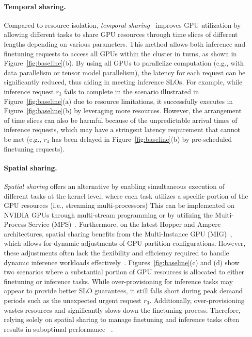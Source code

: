 \paragraph{Temporal sharing.}
Compared to resource isolation, \textit{temporal sharing}~\cite{xiao2018gandiva,xiao2020antman} improves GPU utilization by allowing different tasks to share GPU resources through time slices of different lengths depending on various parameters. 
This method allows both inference and finetuning requests to access all GPUs within the cluster in turns, as shown in Figure~\ref{fig:baseline}(b). By using all GPUs to parallelize computation (e.g., with data parallelism or tensor model parallelism), the latency for each request can be significantly reduced, thus aiding in meeting inference SLOs. For example, while inference request $r_3$ fails to complete in the scenario illustrated in Figure~\ref{fig:baseline}(a) due to resource limitations, it successfully executes in Figure~\ref{fig:baseline}(b) by leveraging more resources. However, the arrangement of time slices can also be harmful because of the unpredictable arrival times of inference requests, which may have a stringent latency requirement that cannot be met (e.g., $r_4$ has been delayed in Figure~\ref{fig:baseline}(b) by pre-scheduled finetuning requests).

\paragraph{Spatial sharing.}
%
\textit{Spatial sharing} offers an alternative by enabling simultaneous execution of different tasks at the kernel level, where each task utilizes a specific portion of the GPU resources (i.e., streaming multi-processors)
%
This can be implemented on NVIDIA GPUs through multi-stream programming or by utilizing the Multi-Process Service (MPS)~\cite{mps}. Furthermore, on the latest Hopper and Ampere architectures, spatial sharing benefits from the Multi-Instance GPU (MIG)~\cite{mig}, which allows for dynamic adjustments of GPU partition configurations.
% 
However, these adjustments often lack the flexibility and efficiency required to handle dynamic inference workloads effectively~\cite{dhakal2020gslice,yu2022survey,migpartition}. Figures~\ref{fig:baseline}(c) and (d) show two scenarios where a substantial portion of GPU resources is allocated to either finetuning or inference tasks. 
% 
While over-provisioning for inference tasks may appear to provide better SLO guarantees, it still falls short during peak demand periods such as the unexpected urgent request $r_3$. Additionally, over-provisioning wastes resources and significantly slows down the finetuning process. 
Therefore, relying solely on spatial sharing to manage finetuning and inference tasks often results in suboptimal performance ~\cite{choi2022serving,zhao2023muxflow}.

